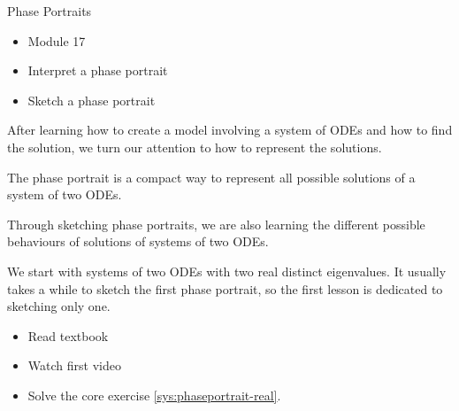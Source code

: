 	





\standardonlynewpage

%
%



\begin{module}{Phase Portraits}
	\label{sys:phase}

	
	
\end{module}



\begin{lesson}

	\begin{itemize}
		\item Module 17
	\end{itemize}

	\begin{itemize}
		\item Interpret a phase portrait
		\item Sketch a phase portrait
	\end{itemize}
	


After learning how to create a model involving a system of ODEs and how to find the solution, we turn our attention to how to represent the solutions.

The phase portrait is a compact way to represent all possible solutions of a system of two ODEs. 

Through sketching phase portraits, we are also learning the different possible behaviours of solutions of systems of two ODEs. 

We start with systems of two ODEs with two real distinct eigenvalues.
It usually takes a while to sketch the first phase portrait, so the first lesson is dedicated to sketching only one.

\begin{itemize}
	\item Read textbook
	\item Watch first video
	\item Solve the core exercise \ref{sys:phaseportrait-real}.
\end{itemize}


\end{lesson}




